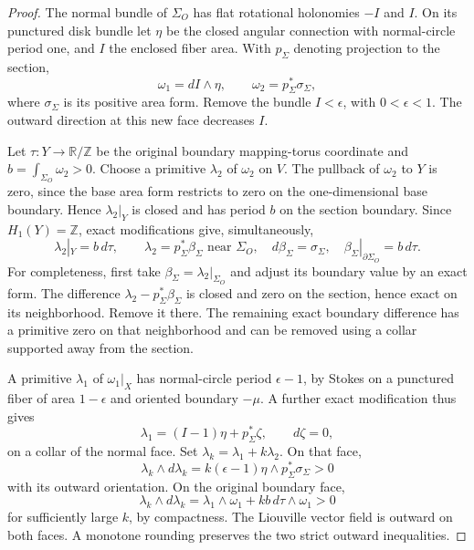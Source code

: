 \documentclass[11pt]{amsart}
\theoremstyle{definition}
\theoremstyle{remark}
\newcommand{\Z}{\mathbb Z}
\begin{document}
\begin{proof}
The normal bundle of $\Sigma_O$ has flat rotational holonomies
$-I$ and $I$. On its punctured disk bundle let $\eta$ be the closed
angular connection with normal-circle period one, and $I$ the enclosed
fiber area. With $p_\Sigma$ denoting projection to the section,
\[
 \omega_1=dI\wedge\eta,\qquad
 \omega_2=p_\Sigma^*\sigma_\Sigma,
\]
where $\sigma_\Sigma$ is its positive area form. Remove the bundle
$I<\epsilon$, with $0<\epsilon<1$. The outward direction at this
new face decreases $I$.

Let $\tau:Y\to\mathbb R/\Z$ be the original boundary mapping-torus
coordinate and $b=\int_{\Sigma_O}\omega_2>0$. Choose a primitive
$\lambda_2$ of $\omega_2$ on $V$. The pullback of $\omega_2$
to $Y$ is zero, since the base area form restricts to zero on the
one-dimensional base boundary. Hence $\lambda_2|_Y$ is closed
and has period $b$ on the section boundary. Since $H_1(Y)=\Z$,
exact modifications give, simultaneously,
\[
 \lambda_2|_Y=b\,d\tau,\qquad
 \lambda_2=p_\Sigma^*\beta_\Sigma\text{ near }\Sigma_O,
 \quad d\beta_\Sigma=\sigma_\Sigma,
 \quad\beta_\Sigma|_{\partial\Sigma_O}=b\,d\tau.
\]
For completeness, first take $\beta_\Sigma=\lambda_2|_{\Sigma_O}$
and adjust its boundary value by an exact form. The difference
$\lambda_2-p_\Sigma^*\beta_\Sigma$ is closed and zero on the section,
hence exact on its neighborhood. Remove it there. The remaining exact
boundary difference has a primitive zero on that neighborhood and can
be removed using a collar supported away from the section.

A primitive $\lambda_1$ of $\omega_1|_X$ has normal-circle period
$\epsilon-1$, by Stokes on a punctured fiber of area $1-\epsilon$
and oriented boundary $-\mu$. A further exact modification thus gives
\[
 \lambda_1=(I-1)\eta+p_\Sigma^*\zeta,
 \qquad d\zeta=0,
\]
on a collar of the normal face. Set $\lambda_k=\lambda_1+k\lambda_2$.
On that face,
\[
 \lambda_k\wedge d\lambda_k
   =k(\epsilon-1)\eta\wedge p_\Sigma^*\sigma_\Sigma>0
\]
with its outward orientation. On the original boundary face,
\[
 \lambda_k\wedge d\lambda_k
 =\lambda_1\wedge\omega_1+kb\,d\tau\wedge\omega_1>0
\]
for sufficiently large $k$, by compactness. The Liouville vector field
is outward on both faces. A monotone rounding preserves the two strict
outward inequalities.


\end{proof}
\end{document}
